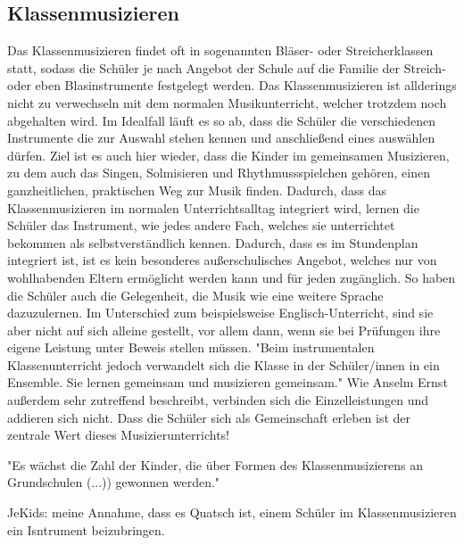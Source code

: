 \subsection{Klassenmusizieren}
Das Klassenmusizieren findet oft in sogenannten Bläser- oder Streicherklassen
statt, sodass die Schüler je nach Angebot der Schule auf die Familie der
Streich- oder eben Blasinstrumente festgelegt werden. Das Klassenmusizieren ist allderings
nicht zu verwechseln mit dem normalen Musikunterricht, welcher trotzdem noch
abgehalten wird.
Im Idealfall läuft es so
ab, dass die Schüler die verschiedenen Instrumente die zur Auswahl stehen kennen
und anschließend eines auswählen dürfen. Ziel ist es auch hier wieder, dass die
Kinder im gemeinsamen Musizieren, zu dem auch das Singen, Solmisieren und 
Rhythmussspielchen gehören, einen ganzheitlichen, praktischen Weg zur Musik
finden. \autocite[91]{ernst:die_zukunftsfaehige_musikschule}
Dadurch, dass das Klassenmusizieren im normalen Unterrichtsalltag integriert
wird, lernen die Schüler das Instrument, wie jedes andere Fach, welches sie
unterrichtet bekommen als selbstverständlich kennen. Dadurch, dass es im
Stundenplan integriert ist, ist es kein besonderes außerschulisches Angebot,
welches nur von wohlhabenden Eltern ermöglicht werden kann und für jeden
zugänglich. So haben die Schüler auch die Gelegenheit, die Musik wie eine
weitere Sprache dazuzulernen. Im Unterschied zum beispielsweise
Englisch-Unterricht, sind sie aber nicht auf sich alleine gestellt, vor allem
dann, wenn sie bei Prüfungen ihre eigene Leistung unter Beweis stellen müssen.
"Beim instrumentalen Klassenunterricht jedoch verwandelt sich die Klasse in der
Schüler/innen in ein Ensemble. Sie lernen gemeinsam und musizieren gemeinsam." \autocite[92]{ernst:die_zukunftsfaehige_musikschule}
Wie Anselm Ernst außerdem sehr zutreffend beschreibt, verbinden sich die
Einzelleistungen und addieren sich nicht. Dass die Schüler sich als Gemeinschaft
erleben ist der zentrale Wert dieses Musizierunterrichts!

"Es wächst die Zahl der Kinder, die über Formen des Klassenmusizierens an
Grundschulen (...)) gewonnen werden." %


JeKids: meine Annahme, dass es Quatsch ist, einem Schüler im Klassenmusizieren
ein Isntrument beizubringen.




